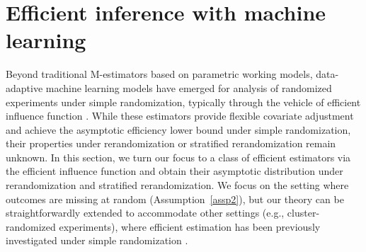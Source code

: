 \documentclass[12pt]{article}
\begin{document}
{\section{Efficient inference with machine learning}\label{sec: eff}
Beyond traditional M-estimators based on parametric working models, data-adaptive machine learning models have emerged for analysis of randomized experiments under simple randomization, typically through the vehicle of efficient influence function \citep{van2011targeted, chernozhukov2018double}. %
While these estimators provide flexible covariate adjustment and achieve the asymptotic efficiency lower bound under simple randomization, 
their properties under rerandomization or stratified rerandomization remain unknown. In this section, we turn our focus to a class of efficient estimators via the efficient influence function and obtain their asymptotic distribution under rerandomization and stratified rerandomization. We focus on the setting where outcomes are missing at random (Assumption~\ref{assp2}), but our theory can be straightforwardly extended to accommodate other settings (e.g., cluster-randomized experiments), where efficient estimation has been previously investigated under simple randomization \citep{wang2023CRT}. 

}
\end{document}
